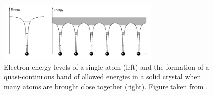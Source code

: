 \documentclass[11pt, twoside]{report}
\begin{document}
\begin{figure}[h!]
  \centering
    \includegraphics[width=0.7\textwidth]{figures/band_Elevels.png}
    \caption{Electron energy levels of a single atom (left) and the formation of a quasi-continuous band of allowed energies in a solid crystal when many atoms are brought close together (right). Figure taken from .}
  \label{band_Elevels}
\end{figure}
\end{document}
